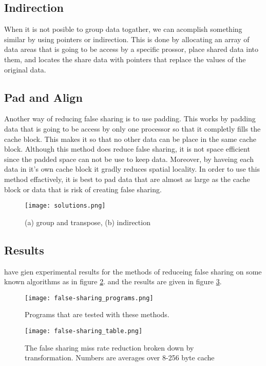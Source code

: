 \subsection*{Indirection}
When it is not posible to group data togather, we can acomplish something similar by using pointers or indirection. This is done by allocating an array of data areas that is going to be access by a specific prossor,
place shared data into them, and locates the share data with pointers that replace the values of the original data.

\subsection*{Pad and Align}
Another way of reducing false sharing is to use padding. This works by padding data that is going to be access by only one processor so that it completly fills the cache block. This makes it so that no other data can be place in the same cache block.
Although this method does reduce false sharing, it is not space efficient since the padded space can not be use to keep data.
Moreover, by haveing each data in it's own cache block it gradly reduces spatial locality.
In order to use this method effactively, it is best to pad data that are almost as large as the cache block or data that is risk of creating false sharing.


\begin{figure}[h]
        \centering
        \texttt{[image: solutions.png]}
        \caption{\label{fig:false_sharing_solutions} (a) group and transpose, (b) indirection}
\end{figure}

\subsection{Results}
\citealp*{jeremiassen1995reducing} have gien experimental results for the methods of reduceing false sharing on some known algorithms as in figure \ref*{fig:false_sharing_programs}. and the results are given in figure \ref*{fig:false_sharing_table}. 

    


\begin{figure}[h]
        \centering
        \texttt{[image: false-sharing\_programs.png]}
        \caption{\label{fig:false_sharing_programs} Programs that are tested with these methods.}
\end{figure}

\begin{figure}[h]
        \centering
        \texttt{[image: false-sharing\_table.png]}
        \caption{\label{fig:false_sharing_table} The false sharing miss rate reduction broken down by transformation. Numbers are averages over 8-256 byte cache}
\end{figure}
